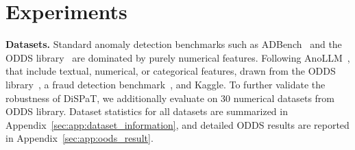 \section{Experiments} \label{4:experiments}


\textbf{Datasets.}
Standard anomaly detection benchmarks such as ADBench~\citep{han2022adbench} and the ODDS library~\citep{rayana2016odds} are dominated by purely numerical features. Following AnoLLM~\citep{tsai2025anollm}, that include textual, numerical, or categorical features, drawn from the ODDS library~\citep{rayana2016odds}, a fraud detection benchmark~\citep{grover2022fraudbench}, and Kaggle. To further validate the robustness of DiSPaT, we additionally evaluate on 30 numerical datasets from ODDS library. Dataset statistics for all datasets are summarized in Appendix~\ref{sec:app:dataset_information}, and detailed ODDS results are reported in Appendix~\ref{sec:app:oods_result}.

